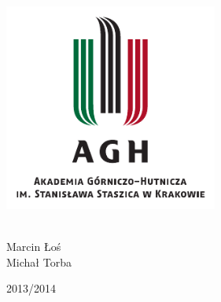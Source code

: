 
\begin{titlepage}
  \begin{center} 

    \includegraphics[width=7cm]{images/agh_logo}
    \vspace{0.5cm}

    {\Huge \textbf{\Title}}
    \\
    \vspace{1cm}
    Marcin Łoś \\
    Michał Torba

    \vfill
    2013\slash 2014

  \end{center}
\end{titlepage}
